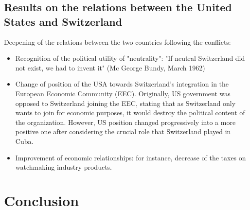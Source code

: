 \documentclass[a4paper]{article}
\begin{document}
\subsection{Results on the relations between the United States and Switzerland}
Deepening of the relations between the two countries following the conflicts:
\begin{itemize}
\item Recognition of the political utility of "neutrality":  "If neutral Switzerland did not exist, we had to invent it" (Mc George Bundy, March 1962)
\item Change of position of the USA towards Switzerland’s integration in the European Economic Community (EEC). Originally, US government was opposed to Switzerland joining the EEC, stating that as Switzerland only wants to join for economic purposes, it would destroy the political content of the organization. However, US position changed progressively into a more positive one after considering the crucial role that Switzerland played in Cuba. 
\item Improvement of economic relationships: for instance, decrease of the taxes on watchmaking industry products. 
\end{itemize}
\section{Conclusion}
\end{document}
